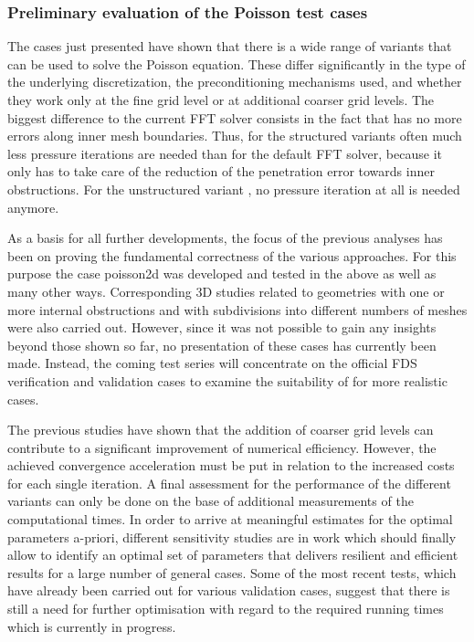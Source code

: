 \subsubsection{Preliminary evaluation of the Poisson test cases}
\label{SEC_SCARC_poisson_evaluation}
The cases just presented have shown that there is a wide range of \scarc{} variants that can be used to solve the Poisson equation. These differ significantly in the type of the underlying discretization, the preconditioning mechanisms used, and whether they work only at the fine grid level or at additional coarser grid levels. The biggest difference to the current FFT solver consists in the fact that \scarc{} has no more errors along inner mesh boundaries. Thus, for the structured \scarc{} variants often much less pressure iterations are needed than for the default FFT solver, because it only has to take care of the reduction of the penetration error towards inner obstructions. For the unstructured variant \uscarc{}, no pressure iteration at all is needed anymore.

As a basis for all further developments, the focus of the previous analyses has been on proving the fundamental correctness of the various \scarc{} approaches. For this purpose the case {\ct poisson2d} was developed and tested in the above as well as many other ways. Corresponding 3D studies related to geometries with one or more internal obstructions and with subdivisions into different numbers of meshes were also carried out. However, since it was not possible to gain any insights beyond those shown so far, no presentation of these cases has currently been made. Instead, the coming test series will concentrate on the official FDS verification and validation cases to examine the suitability of \scarc{} for more realistic cases.

The previous studies have shown that the addition of coarser grid levels can contribute to a significant improvement of numerical efficiency. However, the achieved convergence acceleration must be put in relation to the increased costs for each single iteration.
A final assessment for the performance of the different variants can only be done on the base of additional measurements of the computational times. 
In order to arrive at meaningful estimates for the optimal parameters a-priori, different sensitivity studies are in work which should finally allow to identify an optimal set of parameters that delivers resilient and efficient results for a large number of general cases.
Some of the most recent tests, which have already been carried out for various validation cases, suggest that
there is still a need for further optimisation with regard to the required running times which is currently in progress.

